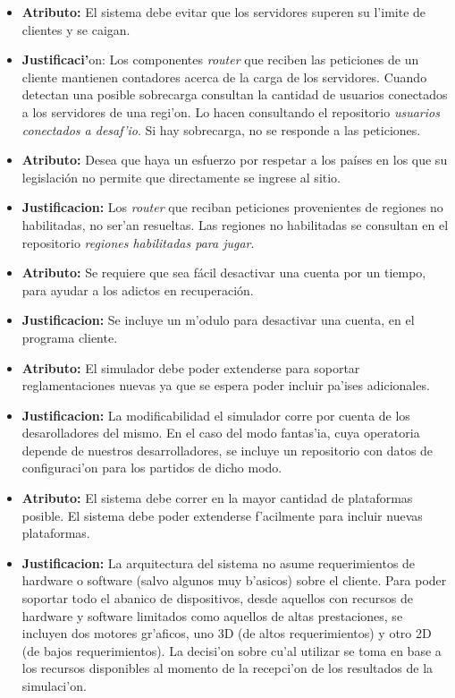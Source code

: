 \begin{itemize}
\item \textbf{Atributo:} El sistema debe evitar que los servidores superen su l'imite de clientes y se caigan.
\item \textbf{Justificaci'}on: Los componentes \textit{router} que reciben las peticiones de un cliente mantienen contadores acerca de la carga de los servidores. Cuando detectan una posible sobrecarga consultan la cantidad de usuarios conectados a los servidores de una regi'on. Lo hacen consultando el repositorio \textit{usuarios conectados a desaf'io}. Si hay sobrecarga, no se responde a las peticiones.

\item \textbf{Atributo:} Desea que haya un esfuerzo por respetar a los países en los que su legislación no permite que directamente se ingrese al sitio.
\item \textbf{Justificacion:} Los \textit{router} que reciban peticiones provenientes de regiones no habilitadas, no ser'an resueltas. Las regiones no habilitadas se consultan en el repositorio \textit{regiones habilitadas para jugar}.

\item \textbf{Atributo:} Se requiere que sea fácil desactivar una cuenta por un tiempo, para ayudar a los adictos en recuperación.
\item \textbf{Justificacion:} Se incluye un m'odulo para desactivar una cuenta, en el programa cliente.

\item \textbf{Atributo:} El simulador debe poder extenderse para soportar reglamentaciones nuevas ya que se espera poder incluir pa'ises adicionales.
\item \textbf{Justificacion:} La modificabilidad el simulador corre por cuenta de los desarolladores del mismo. En el caso del modo fantas'ia, cuya operatoria depende de nuestros desarrolladores, se incluye un repositorio con datos de configuraci'on para los partidos de dicho modo.

\item \textbf{Atributo:} El sistema debe correr en la mayor cantidad de plataformas posible. El sistema debe poder extenderse f'acilmente para incluir nuevas plataformas.
\item \textbf{Justificacion:} La arquitectura del sistema no asume requerimientos de hardware o software (salvo algunos muy b'asicos) sobre el cliente. Para poder soportar todo el abanico de dispositivos, desde aquellos con recursos de hardware y software limitados como aquellos de altas prestaciones, se incluyen dos motores gr'aficos, uno 3D (de altos requerimientos) y otro 2D (de bajos requerimientos). La decisi'on sobre cu'al utilizar se toma en base a los recursos disponibles al momento de la recepci'on de los resultados de la simulaci'on.


\end{itemize}
